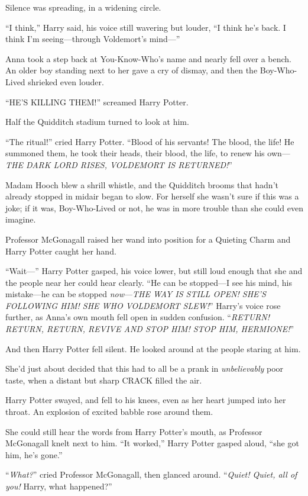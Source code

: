 Silence was spreading, in a widening circle.

“I think,” Harry said, his voice still wavering but louder, “I think he’s back.
I think I’m seeing—through Voldemort’s mind—”

Anna took a step back at You-Know-Who’s name and nearly fell over a bench.
An older boy standing next to her gave a cry of dismay, and then the
Boy-Who-Lived shrieked even louder.

“HE’S KILLING THEM!” screamed Harry Potter.

Half the Quidditch stadium turned to look at him.

“The ritual!” cried Harry Potter. “Blood of his servants! The blood, the life!
He summoned them, he took their heads, their blood, the life, to renew his
own—\emph{THE DARK LORD RISES, VOLDEMORT IS RETURNED!}”

Madam Hooch blew a shrill whistle, and the Quidditch brooms that hadn’t already
stopped in midair began to slow. For herself she wasn’t sure if this was a
joke; if it was, Boy-Who-Lived or not, he was in more trouble than she could
even imagine.

Professor McGonagall raised her wand into position for a Quieting Charm and
Harry Potter caught her hand.

“Wait—” Harry Potter gasped, his voice lower, but still loud enough that she
and the people near her could hear clearly. “He can be stopped—I see his
mind, his mistake—he can be stopped \emph{now}—\emph{THE WAY IS STILL OPEN!
SHE’S FOLLOWING HIM! SHE WHO VOLDEMORT SLEW!}” Harry’s voice rose further, as
Anna’s own mouth fell open in sudden confusion. “\emph{RETURN! RETURN, RETURN,
REVIVE AND STOP HIM! STOP HIM, HERMIONE!}”

And then Harry Potter fell silent. He looked around at the people staring at
him.

She’d just about decided that this had to all be a prank in \emph{unbelievably}
poor taste, when a distant but sharp CRACK filled the air.

Harry Potter swayed, and fell to his knees, even as her heart jumped into her
throat. An explosion of excited babble rose around them.

She could still hear the words from Harry Potter’s mouth, as Professor
McGonagall knelt next to him. “It worked,” Harry Potter gasped aloud, “she got
him, he’s gone.”

“\emph{What?}” cried Professor McGonagall, then glanced around. “\emph{Quiet!
Quiet, all of you!} Harry, what happened?”

